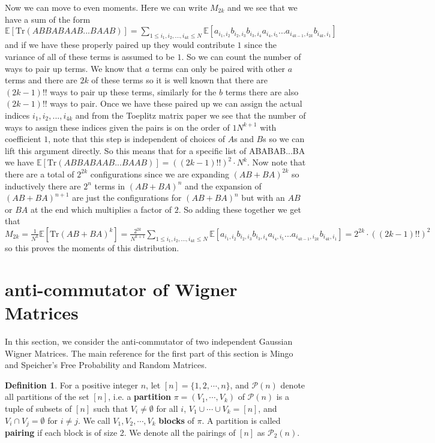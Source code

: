 \documentclass[12pt,reqno]{amsart}
\theoremstyle{plain} %
\theoremstyle{remark}
\theoremstyle{definition}
\newtheorem*{defn}{Definition}
\begin{document}
Now we can move to even moments. Here we can write $M_{2k}$ and we see that we have a sum of the form $\mathbb{E}[\text{Tr}(ABBABAAB...BAAB)]=\sum_{1\leq i_1,i_2,...,i_{4k}\leq N}\mathbb{E}[a_{i_1,i_2}b_{i_2,i_3}b_{i_3,i_4}a_{i_4,i_5}...a_{i_{4k-1},i_{2k}}b_{i_{4k},i_1}]$ and if we have these properly paired up they would contribute $1$ since the variance of all of these terms is assumed to be $1$. So we can count the number of ways to pair up terms. We know that $a$ terms can only be paired with other $a$ terms and there are $2k$ of these terms so it is well known that there are $(2k-1)!!$ ways to pair up these terms, similarly for the $b$ terms there are also $(2k-1)!!$ ways to pair. Once we have these paired up we can assign the actual indices $i_1,i_2,...,i_{4k}$ and from the Toeplitz matrix paper we see that the number of ways to assign these indices given the pairs is on the order of $1N^{k+1}$ with coefficient $1$, note that this step is independent of choices of $A$s and $B$s so we can lift this argument directly. So this means that for a specific list of ABABAB...BA we have $\mathbb{E}[\text{Tr}(ABBABAAB...BAAB)]=((2k-1)!!)^2\cdot N^k$. Now note that there are a total of $2^{2k}$ configurations since we are expanding $(AB+BA)^{2k}$ so inductively there are $2^n$ terms in $(AB+BA)^n$ and the expansion of $(AB+BA)^{n+1}$ are just the configurations for $(AB+BA)^{n}$ but with an $AB$ or $BA$ at the end which multiplies a factor of $2$. So adding these together we get that $M_{2k}=\frac{1}{N^k}\mathbb{E}[\text{Tr}(AB+BA)^k]=\frac{2^{2k}}{N^{k+1}}\sum_{1\leq i_1,i_2,...,i_{4k}\leq N}\mathbb{E}[a_{i_1,i_2}b_{i_2,i_3}b_{i_3,i_4}a_{i_4,i_5}...a_{i_{4k-1},i_{2k}}b_{i_{4k},i_1}]=2^{2k}\cdot ((2k-1)!!)^2$ so this proves the moments of this distribution.

\section{anti-commutator of Wigner Matrices}

In this section, we consider the anti-commutator of two independent Gaussian Wigner Matrices. The main reference for the first part of this section is Mingo and Speicher's Free Probability and Random Matrices. 

\begin{defn}
For a positive integer $n$, let $[n]=\{1, 2, \cdots, n\}$, and $\mathcal{P}(n)$ denote all partitions of the set $[n]$, i.e. a \textbf{partition} $\pi=(V_1,\cdots, V_k)$ of $\mathcal{P}(n)$ is a tuple of subsets of $[n]$ such that $V_i\neq\emptyset$ for all $i$, $V_1\cup\cdots\cup V_k=[n]$, and $V_i\cap V_j=\emptyset$ for $i\neq j$. We call $V_1, V_2, \cdots, V_k$ \textbf{blocks} of $\pi$. A partition is called \textbf{pairing} if each block is of size 2. We denote all the pairings of $[n]$ as $\mathcal{P}_2(n)$.
\end{defn}
\end{document}
